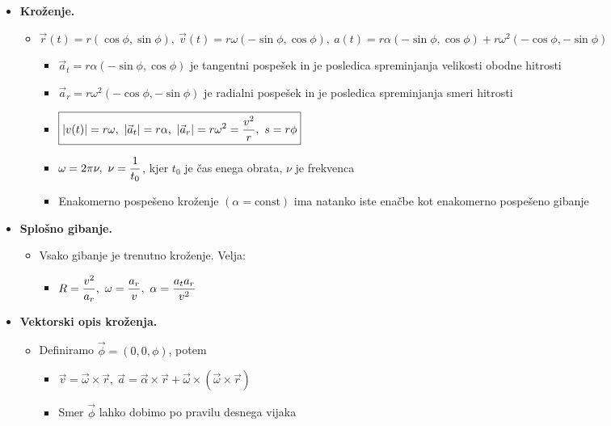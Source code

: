 \begin{itemize}
    \newpage
    \item \textbf{Kroženje.} 
    \begin{itemize}
        \item \(\vec{r}(t) = r (\cos \phi, \sin \phi), \ \vec{v}(t) = r \omega (-\sin \phi, \cos \phi), \ a(t) = r \alpha (-\sin \phi, \cos \phi) + r \omega^2 (-\cos \phi, -\sin \phi)\)
        \begin{itemize}
            \item \(\vec{a}_t = r \alpha (-\sin \phi, \cos \phi)\) je tangentni pospešek in je posledica spreminjanja velikosti obodne hitrosti
            \item \(\vec{a}_r = r \omega^2 (-\cos \phi, -\sin \phi)\) je radialni pospešek in je posledica spreminjanja smeri hitrosti
            \item \(\ds \boxed{|v(t)| = r \omega,\ |\vec{a}_t| = r \alpha, \ |\vec{a}_r| = r \omega^2 = \frac{v^2}{r}, \ s = r \phi}\)
            \item \(\displaystyle \omega = 2 \pi \nu, \ \nu = \frac{1}{t_0}\), kjer \(t_0\) je čas enega obrata, \(\nu\) je frekvenca
            \item Enakomerno pospešeno kroženje \((\alpha = \text{const})\) ima natanko iste enačbe kot enakomerno pospešeno gibanje
        \end{itemize}
    \end{itemize}

    \item \textbf{Splošno gibanje.}
    \begin{itemize}
        \item Vsako gibanje je trenutno kroženje. Velja:
        \begin{itemize}
            \item \(\displaystyle R = \frac{v^2}{a_r}, \ \omega = \frac{a_r}{v}, \ \alpha = \frac{a_t a_r}{v^2}\)
        \end{itemize}
    \end{itemize}

    \item \textbf{Vektorski opis kroženja.}
    \begin{itemize}
        \item Definiramo \(\vec{\phi} = (0, 0, \phi)\), potem
        \begin{itemize}
            \item \(\boxed{\vec{v} = \vec{\omega} \times \vec{r}, \ \vec{a} = \vec{\alpha} \times \vec{r} + \vec{\omega} \times (\vec{\omega} \times \vec{r})}\)
            \item Smer \(\vec{\phi}\) lahko dobimo po pravilu desnega vijaka
        \end{itemize}
    \end{itemize}
\end{itemize}

